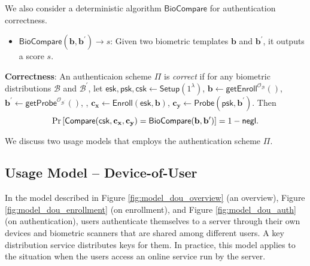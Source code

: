 \noindent We also consider a deterministic algorithm $\textsf{BioCompare}$ for authentication correctness.

\begin{itemize}

	\item $\textsf{BioCompare}(\mathbf{b}, \mathbf{b}^\prime) \to s$: Given two biometric templates $\mathbf{b}$ and $\mathbf{b}^\prime$, it outputs a score $s$. 

\end{itemize}

\noindent \textbf{Correctness}: An authenticaion scheme $\Pi$ is \emph{correct} if for any biometric distributions $\mathcal{B}$ and $\mathcal{B}^\prime$, let $\textsf{esk}, \textsf{psk}, \textsf{csk} \gets \textsf{Setup}(1^\lambda)$, $\mathbf{b} \gets \textsf{getEnroll}^{\mathcal{O}_\mathcal{B}}()$, $\mathbf{b}^\prime \gets \textsf{getProbe}^{\mathcal{O}_{\mathcal{B}^\prime}}()$, , $\mathbf{c_x} \gets \textsf{Enroll}(\textsf{esk}, \mathbf{b})$, $\mathbf{c_y} \gets \textsf{Probe}(\textsf{psk}, \mathbf{b}^\prime)$. Then
	\[
		\Pr \left [
			\textsf{Compare}(\textsf{csk}, \mathbf{c_x}, \mathbf{c_y}) = \textsf{BioCompare}(\mathbf{b}, \mathbf{b}^\prime)
		\right ] = 1 - \mathsf{negl}.
	\]


\iffalse

We discuss two usage models that employs the authentication scheme $\Pi$.




\subsection{Usage Model – Device-of-User}
\label{sec:dou_model}

In the model described in Figure \ref{fig:model_dou_overview} (an overview), Figure \ref{fig:model_dou_enrollment} (on enrollment), and Figure \ref{fig:model_dou_auth} (on authentication), users authenticate themselves to a server through their own devices and biometric scanners that are shared among different users.
A key distribution service distributes keys for them. In practice, this model applies to the situation when the users access an online service run by the server.

